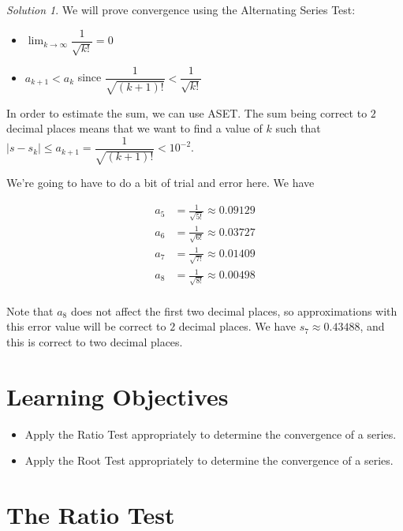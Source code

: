 \documentclass[
]{book}
\providecommand{\tightlist}{%
  \setlength{\itemsep}{0pt}\setlength{\parskip}{0pt}}
\theoremstyle{definition}
\theoremstyle{definition}
\theoremstyle{definition}
\theoremstyle{definition}
\theoremstyle{remark}
\newtheorem*{solution}{Solution}
\begin{document}
\begin{solution}

We will prove convergence using the Alternating Series Test:

\begin{itemize}
\tightlist
\item
  \(\lim_{k\to\infty} \dfrac{1}{\sqrt{k!}}=0\)
\item
  \(a_{k+1}<a_{k}\) since \(\dfrac{1}{\sqrt{(k+1)!}}<\dfrac{1}{\sqrt{k!}}\)
\end{itemize}

In order to estimate the sum, we can use ASET. The sum being correct to \(2\) decimal places means that we want to find a value of \(k\) such that \(|s-s_k|\leq a_{k+1}=\dfrac{1}{\sqrt{(k+1)!}}<10^{-2}\).

We're going to have to do a bit of trial and error here. We have

\begin{align*}
a_5 &= \frac{1}{\sqrt{5!}} \approx 0.09129\\
a_6 &= \frac{1}{\sqrt{6!}} \approx 0.03727 \\
a_7 &= \frac{1}{\sqrt{7!}} \approx 0.01409 \\
a_8 &= \frac{1}{\sqrt{8!}} \approx 0.00498 \\
\end{align*}

Note that \(a_8\) does not affect the first two decimal places, so approximations with this error value will be correct to \(2\) decimal places. We have \(s_7\approx 0.43488\), and this is correct to two decimal places.

\end{solution}

\hypertarget{learning-objectives-29}{%
\section{Learning Objectives}\label{learning-objectives-29}}

\begin{itemize}
\tightlist
\item
  Apply the Ratio Test appropriately to determine the convergence of a series.
\item
  Apply the Root Test appropriately to determine the convergence of a series.
\end{itemize}

\hypertarget{the-ratio-test}{%
\section{The Ratio Test}\label{the-ratio-test}}
\end{document}
